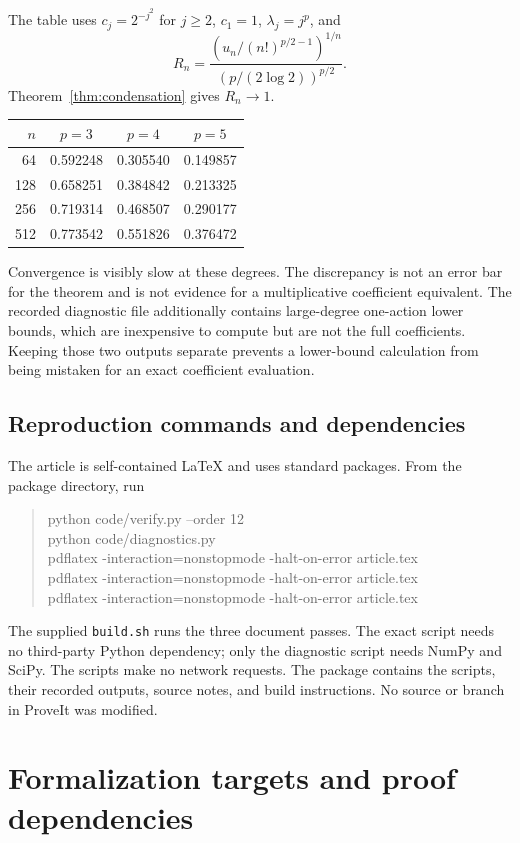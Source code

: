 \documentclass[11pt,a4paper]{article}
\numberwithin{equation}{section}
\theoremstyle{definition}
\theoremstyle{remark}
\theoremstyle{definition}
\begin{document}
The table uses $c_j=2^{-j^2}$ for $j\ge2$, $c_1=1$,
$\lambda_j=j^p$, and
\[
 R_n=\frac{(u_n/(n!)^{p/2-1})^{1/n}}
                {(p/(2\log2))^{p/2}}.
\]
Theorem~\ref{thm:condensation} gives $R_n\to1$.
\begin{center}
\begin{tabular}{@{}rccc@{}}
\toprule
$n$ & $p=3$ & $p=4$ & $p=5$\\
\midrule
64  & 0.592248 & 0.305540 & 0.149857\\
128 & 0.658251 & 0.384842 & 0.213325\\
256 & 0.719314 & 0.468507 & 0.290177\\
512 & 0.773542 & 0.551826 & 0.376472\\
\bottomrule
\end{tabular}
\end{center}
Convergence is visibly slow at these degrees. The discrepancy is not an
error bar for the theorem and is not evidence for a multiplicative
coefficient equivalent. The recorded diagnostic file additionally
contains large-degree one-action lower bounds, which are inexpensive to
compute but are not the full coefficients. Keeping those two outputs
separate prevents a lower-bound calculation from being mistaken for an
exact coefficient evaluation.

\subsection{Reproduction commands and dependencies}
The article is self-contained LaTeX and uses standard packages. From
the package directory, run
\begin{quote}\small\ttfamily\raggedright
python code/verify.py --order 12\\
python code/diagnostics.py\\
pdflatex -interaction=nonstopmode -halt-on-error article.tex\\
pdflatex -interaction=nonstopmode -halt-on-error article.tex\\
pdflatex -interaction=nonstopmode -halt-on-error article.tex
\end{quote}
The supplied \texttt{build.sh} runs the three document passes. The exact
script needs no third-party Python dependency; only the diagnostic
script needs NumPy and SciPy. The scripts make no network requests.
The package contains the scripts, their recorded outputs, source notes,
and build instructions. No source or branch in ProveIt was modified.

\section{Formalization targets and proof dependencies}
\label{sec:formalization}
\end{document}
